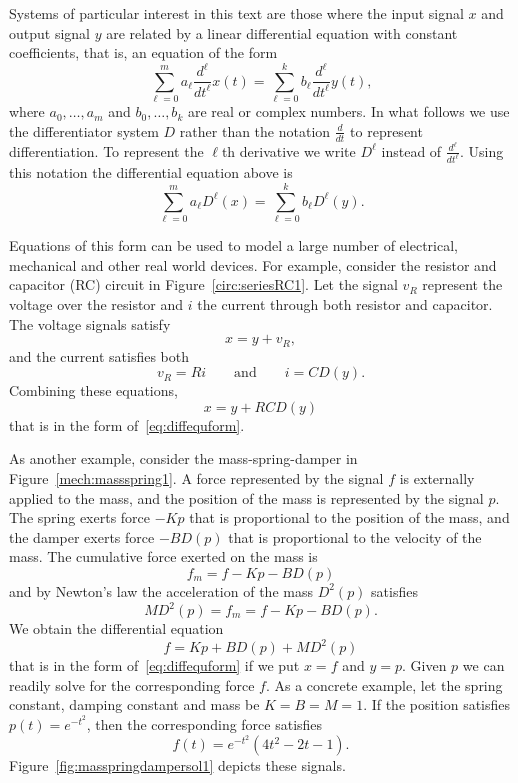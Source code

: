 \documentclass[11pt,a4paper]{book}
\theoremstyle{plain}
\numberwithin{equation}{section}
\begin{document}
Systems of particular interest in this text are those where the input signal $x$ and output signal $y$ are related by a linear differential equation with constant coefficients, that is, an equation of the form
\[
\sum_{\ell=0}^{m} a_\ell \frac{d^\ell}{d t^\ell} x(t) = \sum_{\ell=0}^{k} b_\ell \frac{d^\ell}{d t^\ell} y(t),
\]
where $a_0,\dots,a_m$ and $b_0,\dots,b_k$ are real or complex numbers.  In what follows we use the differentiator system $D$ rather than the notation $\frac{d}{d t}$ to represent differentiation.  To represent the $\ell$th derivative we write $D^\ell$ instead of  $\frac{d^\ell}{d t^\ell}$.  Using this notation the differential equation above is
\begin{equation}\label{eq:diffequform}
\sum_{\ell=0}^{m} a_\ell D^\ell(x) = \sum_{\ell=0}^{k} b_\ell D^\ell(y). 
\end{equation}

Equations of this form can be used to model a large number of electrical, mechanical and other real world devices.  For example, consider the resistor and capacitor (RC) circuit in Figure~\ref{circ:seriesRC1}.  Let the signal $v_R$ represent the voltage over the resistor and $i$ the current through both resistor and capacitor.  The voltage signals satisfy
\[
x = y + v_R,
\]
and the current satisfies both
\[
v_R = R i \qquad \text{and} \qquad i = C D(y).
\]
Combining these equations,
\begin{equation}\label{eq:RCdiffeq}
x = y + RC D(y)
\end{equation}
that is in the form of~\eqref{eq:diffequform}.

As another example, consider the mass-spring-damper in Figure~\ref{mech:massspring1}.  A force represented by the signal $f$ is externally applied to the mass, and the position of the mass is represented by the signal $p$.  The spring exerts force $-K p$ that is proportional to the position of the mass, and the damper exerts force $-B D(p)$ that is proportional to the velocity of the mass.  The cumulative force exerted on the mass is
\[
f_m = f - K p - B D(p)
\]
and by Newton's law the acceleration of the mass $D^2(p)$ satisfies
\[
M D^2(p) = f_m = f - K p - B D(p).
\]
We obtain the differential equation
\begin{equation}\label{eq:diffeqmasspringdamper}
f = K p + B D(p) + M D^2(p)
\end{equation}
that is in the form of~\eqref{eq:diffequform} if we put $x = f$ and $y = p$.   Given $p$ we can readily solve for the corresponding force $f$.  As a concrete example, let the spring constant, damping constant and mass be $K=B=M=1$.  If the position satisfies $p(t) = e^{-t^2}$, then the corresponding force satisfies
\[
f(t) = e^{-t^2} (4 t^2-2 t-1).
\]
Figure~\ref{fig:masspringdampersol1} depicts these signals.
\end{document}
